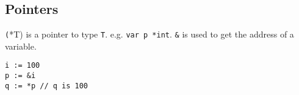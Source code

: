 \subsection {Pointers}
\texttt(*T) is a pointer to type \texttt{T}. e.g. \texttt{var p *int}.
\texttt{&} is used to get the address of a variable.
\begin{lstlisting}
i := 100
p := &i
q := *p // q is 100
\end{lstlisting}
